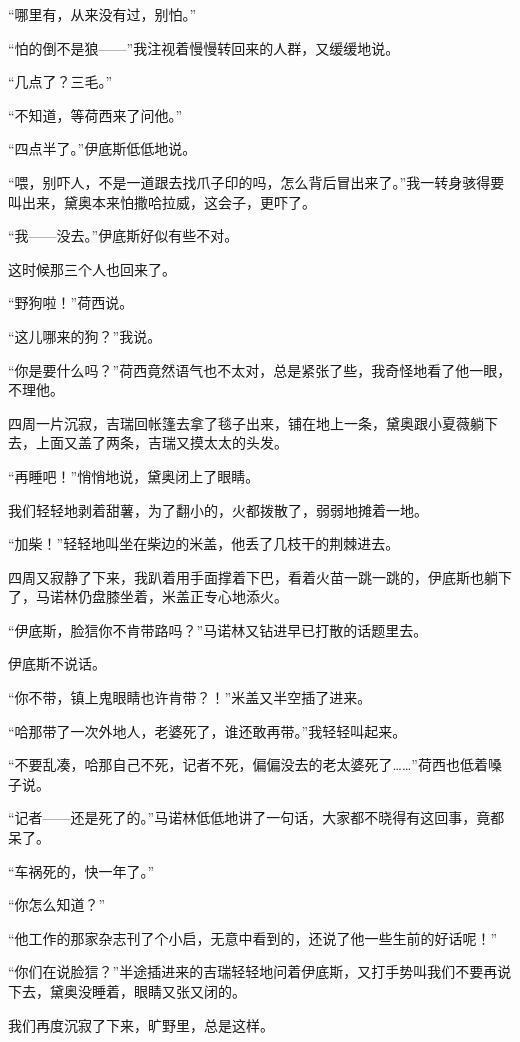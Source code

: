 \par “哪里有，从来没有过，别怕。”
\par “怕的倒不是狼——”我注视着慢慢转回来的人群，又缓缓地说。
\par “几点了？三毛。”
\par “不知道，等荷西来了问他。”
\par “四点半了。”伊底斯低低地说。
\par “喂，别吓人，不是一道跟去找爪子印的吗，怎么背后冒出来了。”我一转身骇得要叫出来，黛奥本来怕撒哈拉威，这会子，更吓了。
\par “我——没去。”伊底斯好似有些不对。
\par 这时候那三个人也回来了。
\par “野狗啦！”荷西说。
\par “这儿哪来的狗？”我说。
\par “你是要什么吗？”荷西竟然语气也不太对，总是紧张了些，我奇怪地看了他一眼，不理他。
\par 四周一片沉寂，吉瑞回帐篷去拿了毯子出来，铺在地上一条，黛奥跟小夏薇躺下去，上面又盖了两条，吉瑞又摸太太的头发。
\par “再睡吧！”悄悄地说，黛奥闭上了眼睛。
\par 我们轻轻地剥着甜薯，为了翻小的，火都拨散了，弱弱地摊着一地。
\par “加柴！”轻轻地叫坐在柴边的米盖，他丢了几枝干的荆棘进去。
\par 四周又寂静了下来，我趴着用手面撑着下巴，看着火苗一跳一跳的，伊底斯也躺下了，马诺林仍盘膝坐着，米盖正专心地添火。
\par “伊底斯，脸狺你不肯带路吗？”马诺林又钻进早已打散的话题里去。
\par 伊底斯不说话。
\par “你不带，镇上鬼眼睛也许肯带？！”米盖又半空插了进来。
\par “哈那带了一次外地人，老婆死了，谁还敢再带。”我轻轻叫起来。
\par “不要乱凑，哈那自己不死，记者不死，偏偏没去的老太婆死了……”荷西也低着嗓子说。
\par “记者——还是死了的。”马诺林低低地讲了一句话，大家都不晓得有这回事，竟都呆了。
\par “车祸死的，快一年了。”
\par “你怎么知道？”
\par “他工作的那家杂志刊了个小启，无意中看到的，还说了他一些生前的好话呢！”
\par “你们在说脸狺？”半途插进来的吉瑞轻轻地问着伊底斯，又打手势叫我们不要再说下去，黛奥没睡着，眼睛又张又闭的。
\par 我们再度沉寂了下来，旷野里，总是这样。
